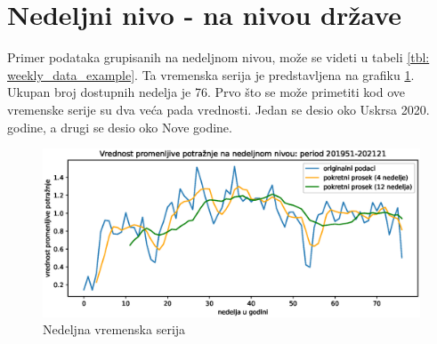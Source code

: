 \documentclass[12pt,oneside]{memoir}
\begin{document}
\section{Nedeljni nivo - na nivou države}
Primer podataka grupisanih na nedeljnom nivou, može se videti u tabeli \ref{tbl: weekly_data_example}. Ta vremenska serija je predstavljena na grafiku \ref{fig: nedeljna_serija}. Ukupan broj dostupnih nedelja je 76. Prvo što se može primetiti kod ove vremenske serije su dva veća pada vrednosti. Jedan se desio oko Uskrsa 2020. godine, a drugi se desio oko Nove godine.
\begin{figure}[!ht]
  \centering
  \includegraphics[width=1\textwidth]{./grafici/nedeljna_vremenska_serija.eps}
  \caption{Nedeljna vremenska serija}
  \label{fig: nedeljna_serija}
\end{figure}
\end{document}
